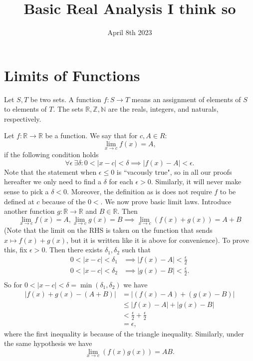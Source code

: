 \documentclass{article}[11pt]
\title{Basic Real Analysis I think so}
\date{April 8th 2023}
\author{}
\newcommand{\R}{\mathbb{R}}
\newcommand{\Z}{\mathbb{Z}}
\newcommand{\N}{\mathbb{N}}
\newcommand{\eps}{\epsilon}
\begin{document}
    \maketitle
    \section{Limits of Functions}
    Let $S, T$ be two sets. A function $f: S \to T$ means an assignment of elements of $S$ to elements of $T$. The sets $\R, \Z, \N$ are the reals, integers, and naturals, respectively.

    Let $f: \R \to \R$ be a function. We say that for $c, A \in R$:
    $$ \lim_{x \to c} f(x) = A ,$$
    if the following condition holds
    $$ \forall \eps~\exists \delta : 0 < |x - c| < \delta \implies |f(x) - A| < \eps .$$
    Note that the statement when $\eps \leq 0$ is ``vacously true", so in all our proofs hereafter we only need to find a $\delta$ for each $\eps > 0$. Similarly, it will never make sense to pick a $\delta < 0$. Moreover, the definition as is does not require $f$ to be defined at $c$ because of the $0 < $.
    We now prove basic limit laws. Introduce another function $g: \R \to \R$ and $B \in \R$. Then
    $$ \lim_{x \to c} f(x) = A, \lim_{x \to c} g(x) = B \implies \lim_{x \to c} \left(f(x) + g(x)\right) = A + B $$
    (Note that the limit on the RHS is taken on the function that sends $x \mapsto f(x) + g(x)$, but it is written like it is above for convenience). To prove this, fix $\epsilon > 0$. Then there exists $\delta_1, \delta_2$ such that 
    \begin{align*}
        0 < |x - c| < \delta_1 &\implies |f(x) - A| < \frac{\eps}{2} \\
        0 < |x - c| < \delta_2 &\implies |g(x) - B| < \frac{\eps}{2} .\\
    \end{align*}
    So for $0 < |x - c| < \delta = \min\left(\delta_1, \delta_2\right)$ we have
    \begin{align*}
        |f(x) + g(x) - (A + B)| &= |(f(x) - A) + (g(x) - B)| \\
                                &\leq |f(x) - A| + |g(x) - B| \\
                                &< \frac{\eps}{2} + \frac{\eps}{2} \\
                                &= \eps,
    \end{align*}
    where the first inequality is because of the triangle inequality. Similarly, under the same hypothesis we have
    $$ \lim_{x \to c} \left(f(x)g(x)\right) = AB .$$
\end{document}

